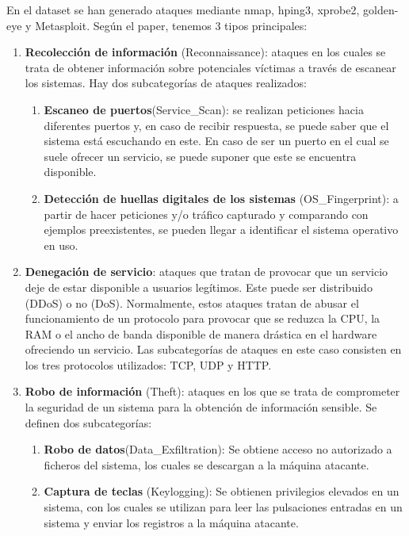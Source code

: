 En el dataset se han generado ataques mediante nmap, hping3, xprobe2, golden-eye y Metasploit. Según el paper, tenemos 3 tipos principales: 
\begin{enumerate}
    \item \textbf{Recolección de información} (Reconnaissance): ataques en los cuales se trata de obtener información sobre potenciales víctimas a través de escanear los sistemas. Hay dos subcategorías de ataques realizados:
    \begin{enumerate}
        \item \textbf{Escaneo de puertos}(Service\_Scan): se realizan peticiones hacia diferentes puertos y, en caso de recibir respuesta, se puede saber que el sistema está escuchando en este. En caso de ser un puerto en el cual se suele ofrecer un servicio, se puede suponer que este se encuentra disponible.
        \item \textbf{Detección de huellas digitales de los sistemas} (OS\_Fingerprint): a partir de hacer peticiones y/o tráfico capturado y comparando con ejemplos preexistentes, se pueden llegar a identificar el sistema operativo en uso.
    \end{enumerate}
    \item \textbf{Denegación de servicio}: ataques que tratan de provocar que un servicio deje de estar disponible a usuarios legítimos. Este puede ser distribuido (DDoS) o no (DoS). Normalmente, estos ataques tratan de abusar el funcionamiento de un protocolo para provocar que se reduzca la CPU, la RAM o el ancho de banda disponible de manera drástica en el hardware ofreciendo un servicio. Las subcategorías de ataques en este caso consisten en los tres protocolos utilizados: TCP, UDP y HTTP.
    \item \textbf{Robo de información} (Theft): ataques en los que se trata de comprometer la seguridad de un sistema para la obtención de información sensible. Se definen dos subcategorías:
    \begin{enumerate}
        \item \textbf{Robo de datos}(Data\_Exfiltration): Se obtiene acceso no autorizado a ficheros del sistema, los cuales se descargan a la máquina atacante.
        \item \textbf{Captura de teclas} (Keylogging): Se obtienen privilegios elevados en un sistema, con los cuales se utilizan para leer las pulsaciones entradas en un sistema y enviar los registros a la máquina atacante.
    \end{enumerate}
\end{enumerate}



